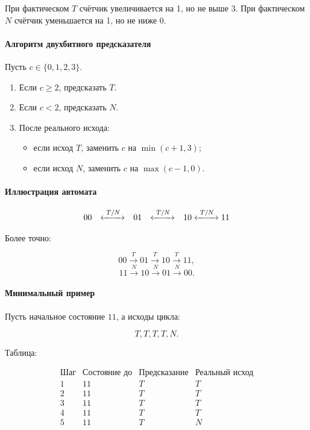 \documentclass[12pt,a4paper]{article}
\begin{document}
При фактическом $T$ счётчик увеличивается на 1, но не выше $3$.
При фактическом $N$ счётчик уменьшается на 1, но не ниже $0$.

\paragraph{Алгоритм двухбитного предсказателя}

Пусть $c \in \{0,1,2,3\}$.

\begin{enumerate}
    \item Если $c \geq 2$, предсказать $T$.
    \item Если $c < 2$, предсказать $N$.
    \item После реального исхода:
    \begin{itemize}
        \item если исход $T$, заменить $c$ на $\min(c+1,3)$;
        \item если исход $N$, заменить $c$ на $\max(c-1,0)$.
    \end{itemize}
\end{enumerate}

\paragraph{Иллюстрация автомата}

\[
\begin{array}{ccccc}
00 & \xleftrightarrow{\ T/N\ } & 01 & \xleftrightarrow{\ T/N\ } & 10 \xleftrightarrow{\ T/N\ } 11
\end{array}
\]

Более точно:

\[
00 \xrightarrow{T} 01 \xrightarrow{T} 10 \xrightarrow{T} 11,
\]
\[
11 \xrightarrow{N} 10 \xrightarrow{N} 01 \xrightarrow{N} 00.
\]

\paragraph{Минимальный пример}

Пусть начальное состояние $11$, а исходы цикла:

\[
    T,T,T,T,N.
\]

Таблица:

\[
\begin{array}{c|c|c|c}
\text{Шаг} & \text{Состояние до} & \text{Предсказание} & \text{Реальный исход} \\
\hline
1 & 11 & T & T \\
2 & 11 & T & T \\
3 & 11 & T & T \\
4 & 11 & T & T \\
5 & 11 & T & N
\end{array}
\]
\end{document}
